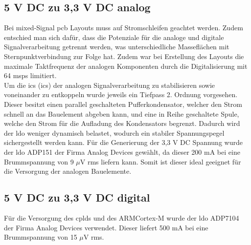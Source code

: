 \subsection*{5 V DC zu 3,3 V DC analog}
Bei mixed-Signal \ac{pcb} Layouts muss auf Stromschleifen geachtet werden. Zudem entschied man sich dafür, dass die Potenziale für die analoge und digitale Signalverarbeitung getrennt werden, was unterschiedliche Masseflächen mit Sternpunktverbindung zur Folge hat. Zudem war bei Erstellung des Layouts die maximale Taktfrequenz der analogen Komponenten durch die Digitalisierung mit 64 \ac{msps} limitiert.\\
Um die \acl{ic}s (\acs{ic}s) der analogen Signalverarbeitung zu stabilisieren sowie voneinander zu entkoppeln wurde jeweils ein Tiefpass 2. Ordnung vorgesehen. Dieser besitzt einen parallel geschalteten Pufferkondensator, welcher den Strom schnell an das Bauelement abgeben kann, und eine in Reihe geschaltete Spule, welche den Strom für die Aufladung des Kondensators begrenzt. Dadurch wird der \ac{ldo} weniger dynamisch belastet, wodurch ein stabiler Spannungspegel sichergestellt werden kann. Für die Generierung der 3,3 V DC Spannung wurde der \ac{ldo} ADP151 der Firma Analog Devices gewählt, da dieser 200 mA bei eine Brummspannung von 9 $\mu$V rms liefern kann. Somit ist dieser ideal geeignet für die Versorgung der analogen Bauelemente.
%
%
\subsection*{5 V DC zu 3,3 V DC digital}
Für die Versorgung des \ac{cpld}s und des ARM\SymbReg Cortex\SymbReg-M wurde der \ac{ldo} ADP7104 der Firma Analog Devices verwendet. Dieser liefert 500 mA bei eine Brummspannung von 15 $\mu$V rms.
